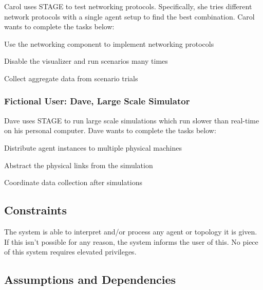 \documentclass[titlepage]{article}
\begin{document}
Carol uses STAGE to test networking protocols.  Specifically, she tries different network protocols with a single agent
setup to find the best combination.  Carol wants to complete the tasks below:

\begin{itemize*}
    \item Use the networking component to implement networking protocols
    \item Disable the visualizer and run scenarios many times
    \item Collect aggregate data from scenario trials
\end{itemize*}

\subsubsection{Fictional User: Dave, Large Scale Simulator%
  \label{bob}%
}

Dave uses STAGE to run large scale simulations which run slower than real-time on his personal computer.  Dave wants to
complete the tasks below:

\begin{itemize*}
    \item Distribute agent instances to multiple physical machines
    \item Abstract the physical links from the simulation
    \item Coordinate data collection after simulations
\end{itemize*}

\subsection{Constraints%
  \label{constraints}%
}

The system is able to interpret and/or process any agent or topology it is given.  If this isn't possible for any reason, the system informs the user of this. No piece of this system requires elevated privileges.


\subsection{Assumptions and Dependencies%
  \label{assumptions-and-dependencies}%
}
\end{document}
